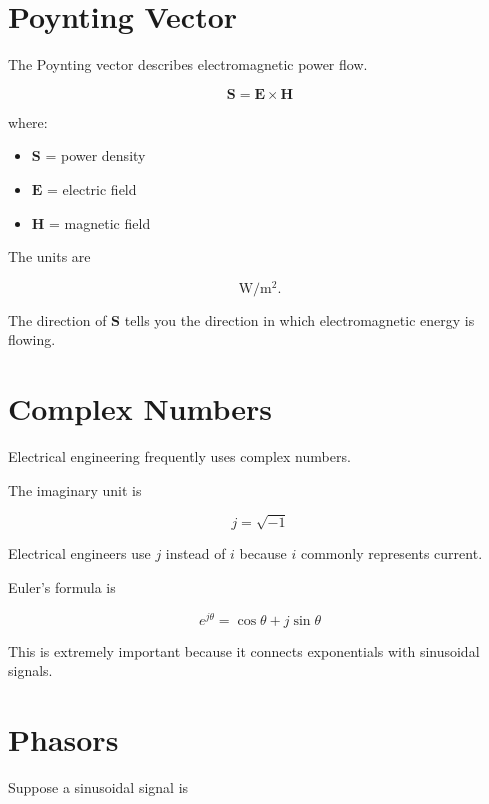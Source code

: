 \documentclass[11pt]{article}
\newcommand{\vect}[1]{\mathbf{#1}}
\begin{document}
\section{Poynting Vector}

The Poynting vector describes electromagnetic power flow.

\[
\boxed{
\vect{S}
=
\vect{E}\times\vect{H}
}
\]

where:

\begin{itemize}
    \item $\vect{S}$ = power density
    \item $\vect{E}$ = electric field
    \item $\vect{H}$ = magnetic field
\end{itemize}

The units are

\[
\mathrm{W/m^2}.
\]

The direction of $\vect{S}$ tells you the direction in which electromagnetic energy is flowing.



\section{Complex Numbers}

Electrical engineering frequently uses complex numbers.

The imaginary unit is

\[
\boxed{
j=\sqrt{-1}
}
\]

Electrical engineers use $j$ instead of $i$ because $i$ commonly represents current.

Euler's formula is

\[
\boxed{
e^{j\theta}
=
\cos\theta
+
j\sin\theta
}
\]

This is extremely important because it connects exponentials with sinusoidal signals.



\section{Phasors}

Suppose a sinusoidal signal is
\end{document}

